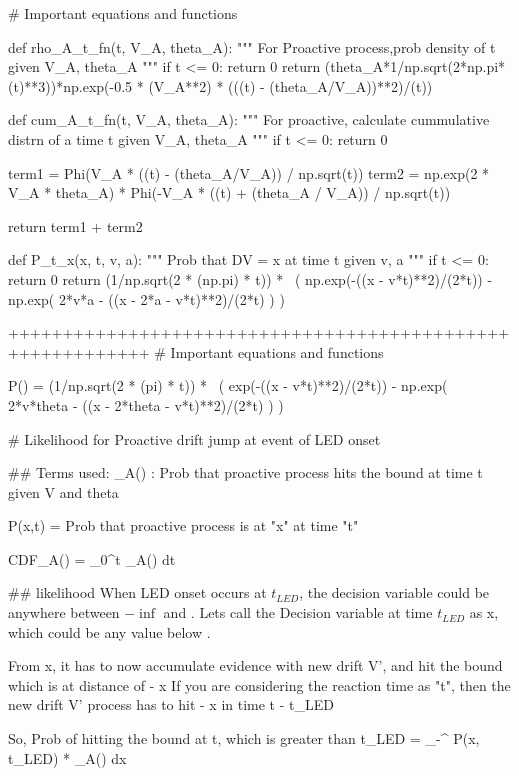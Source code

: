 # Important equations and functions

def rho_A_t_fn(t, V_A, theta_A):
    """
    For Proactive process,prob density of t given V_A, theta_A
    """
    if t <= 0:
        return 0
    return (theta_A*1/np.sqrt(2*np.pi*(t)**3))*np.exp(-0.5 * (V_A**2) * (((t) - (theta_A/V_A))**2)/(t))


def cum_A_t_fn(t, V_A, theta_A):
        """
        For proactive, calculate cummulative distrn of a time t given V_A, theta_A
        """
        if t <= 0:
        return 0

        term1 = Phi(V_A * ((t) - (theta_A/V_A)) / np.sqrt(t))
        term2 = np.exp(2 * V_A * theta_A) * Phi(-V_A * ((t) + (theta_A / V_A)) / np.sqrt(t))
        
        return term1 + term2

def P_t_x(x, t, v, a):
    """
    Prob that DV = x at time t given v, a 
    """
    if t <= 0:
        return 0
    return (1/np.sqrt(2 * (np.pi) * t)) * \
        ( np.exp(-((x - v*t)**2)/(2*t)) - np.exp( 2*v*a - ((x - 2*a - v*t)**2)/(2*t) ) )

+++++++++++++++++++++++++++++++++++++++++++++++++++++++++++
# Important equations and functions

P()  =  (1/np.sqrt(2 * (pi) * t)) * \
        ( exp(-((x - v*t)**2)/(2*t)) - np.exp( 2*v*theta - ((x - 2*theta - v*t)**2)/(2*t) ) )


        

# Likelihood for Proactive drift jump at event of LED onset


## Terms used: 
\rho_A() : Prob that proactive process hits the bound at time t given V and theta

P(x,t) = Prob that proactive process is at "x" at time "t"

CDF_A() = \int_{0}^{t} \rho_A() dt

## likelihood 
When LED onset occurs at $ t_{LED} $, the decision variable could be anywhere between $-\inf$ and \theta. 
Lets call the Decision variable at time $ t_{LED} $ as x, which could be any value below \theta.

From x, it has to now accumulate evidence with new drift V', and hit the bound which is at distance of \theta - x
If you are considering the reaction time as "t", then the new drift V' process has to hit \theta - x in time t - t_{LED}

So, Prob of hitting the bound at t, which is greater than t_LED
 = \int_{-\inf}^{\theta} P(x, t_{LED}) * \rho_A() dx

